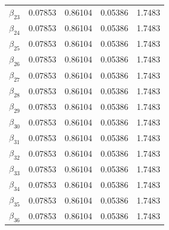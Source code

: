 \begin{table} [H]
\begin{tabularx}{\textwidth}{l|XXXX}
		$\beta_{23}$ & 0.07853 & 0.86104 & 0.05386 & 1.7483\\
		$\beta_{24}$ & 0.07853 & 0.86104 & 0.05386 & 1.7483\\
		$\beta_{25}$ & 0.07853 & 0.86104 & 0.05386 & 1.7483\\
		$\beta_{26}$ & 0.07853 & 0.86104 & 0.05386 & 1.7483\\
		$\beta_{27}$ & 0.07853 & 0.86104 & 0.05386 & 1.7483\\
		$\beta_{28}$ & 0.07853 & 0.86104 & 0.05386 & 1.7483\\
		$\beta_{29}$ & 0.07853 & 0.86104 & 0.05386 & 1.7483\\
		$\beta_{30}$ & 0.07853 & 0.86104 & 0.05386 & 1.7483\\
		$\beta_{31}$ & 0.07853 & 0.86104 & 0.05386 & 1.7483\\
		$\beta_{32}$ & 0.07853 & 0.86104 & 0.05386 & 1.7483\\
		$\beta_{33}$ & 0.07853 & 0.86104 & 0.05386 & 1.7483\\
		$\beta_{34}$ & 0.07853 & 0.86104 & 0.05386 & 1.7483\\
		$\beta_{35}$ & 0.07853 & 0.86104 & 0.05386 & 1.7483\\
		$\beta_{36}$ & 0.07853 & 0.86104 & 0.05386 & 1.7483\\ \hline
	\end{tabularx}
\end{table}
\fi